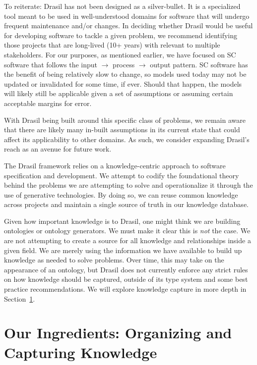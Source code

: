 To reiterate: Drasil has not been designed as a silver-bullet. It is a 
specialized tool meant to be used in well-understood domains for software that 
will undergo frequent maintenance and/or changes. In deciding whether Drasil 
would be useful for developing software to tackle a given problem, we recommend 
identifying those projects that are long-lived (10+ years) with \sfs{} 
relevant to multiple stakeholders. For our purposes, as mentioned earlier, we 
have focused on SC software that follows the input $\rightarrow$ process 
$\rightarrow$ output pattern. SC software has the benefit of being relatively 
slow to change, so models used today may not be updated or invalidated for some 
time, if ever. Should that happen, the models will likely still be applicable 
given a set of assumptions or assuming certain acceptable margins for error.

With Drasil being built around this specific class of problems, we remain aware 
that there are likely many in-built assumptions in its current state that could 
affect its applicability to other domains. As such, we consider expanding 
Drasil's reach as an avenue for future work.

The Drasil framework relies on a knowledge-centric approach to software 
specification and development. We attempt to codify the foundational theory 
behind the problems we are attempting to solve and operationalize it through 
the use of generative technologies. By doing so, we can reuse common knowledge 
across projects and maintain a single source of truth in our knowledge database.

Given how important knowledge is to Drasil, one might think we are building 
ontologies or ontology generators. We must make it clear this is \emph{not} the 
case. We are not attempting to create a source for all knowledge and 
relationships inside a given field. We are merely using the information we have 
available to build up knowledge as needed to solve problems. Over time, this 
may take on the appearance of an ontology, but Drasil does not currently 
enforce any strict rules on how knowledge should be captured, outside of its 
type system and some best practice recommendations. We will explore knowledge 
capture in more depth in Section~\ref{sec:kc}.

\section{Our Ingredients: Organizing and Capturing Knowledge}
\label{sec:kc}

